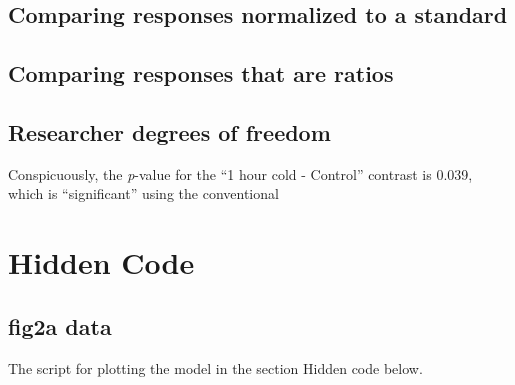 \documentclass[]{book}
\newenvironment{Shaded}{\begin{snugshade}}{\end{snugshade}}
\newcommand{\ErrorTok}[1]{\textcolor[rgb]{0.64,0.00,0.00}{\textbf{#1}}}
\newcommand{\KeywordTok}[1]{\textcolor[rgb]{0.13,0.29,0.53}{\textbf{#1}}}
\newcommand{\NormalTok}[1]{#1}
\newcommand{\OperatorTok}[1]{\textcolor[rgb]{0.81,0.36,0.00}{\textbf{#1}}}
\newcommand{\StringTok}[1]{\textcolor[rgb]{0.31,0.60,0.02}{#1}}
\begin{document}
\hypertarget{comparing-responses-normalized-to-a-standard}{%
\subsection{Comparing responses normalized to a standard}\label{comparing-responses-normalized-to-a-standard}}

\hypertarget{comparing-responses-that-are-ratios}{%
\subsection{Comparing responses that are ratios}\label{comparing-responses-that-are-ratios}}

\hypertarget{researcher-degrees-of-freedom}{%
\subsection{Researcher degrees of freedom}\label{researcher-degrees-of-freedom}}

Conspicuously, the \emph{p}-value for the ``1 hour cold - Control'' contrast is 0.039, which is ``significant'' using the conventional

\hypertarget{hidden-code-1}{%
\section{Hidden Code}\label{hidden-code-1}}

\hypertarget{fig2a-data}{%
\subsection{fig2a data}\label{fig2a-data}}

The script for plotting the model in the section Hidden code below.

\begin{Shaded}
\end{Shaded}
\end{document}
